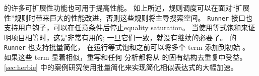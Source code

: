 \egg 的许多可扩展性功能也可用于提高性能。
如上所述，规则调度可以在面对“扩展性”规则时带来巨大的性能改进，否则这些规则将主导搜索空间。
\texttt{Runner} 接口也支持用户钩子，可以在任意条件后停止equality saturation。
当使用等式饱和来证明项目相等时，这是非常有用的; 
  一旦它们一致，就没有继续的必要了。
\label{sec:egg-batched}
\egg 的 \texttt{Runner} 也支持批量简化，
  在运行等式饱和之前可以将多个 term 添加到初始 \egraph。
如果这些 term 显着相似，重写和任何 \eclass 分析都将从 \egraph 的固有结构去重复中受益。
\autoref{sec:herbie} 中的案例研究使用批量简化来实现简化相似表达式的大幅加速。

